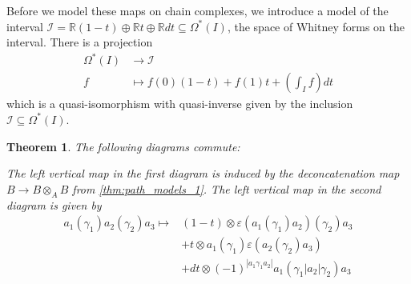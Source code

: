 \documentclass{scrartcl}
\theoremstyle{plain}
\newtheorem{theorem}{Theorem}[section]
\theoremstyle{definition}
\newtheorem{remark}[theorem]{Remark}
\newcommand{\R}{\mathbb R}
\newcommand{\Z}{\mathbb Z}
\newcommand{\abs}[1]{\left\lvert#1\right\rvert}
\renewcommand{\subset}{\subseteq}
\DeclareMathOperator{\Map}{Map}
\begin{document}

Before we model these maps on chain complexes, we introduce a model of the interval $\mathcal I = \R (1-t) \oplus \R t \oplus \R dt\subset \Omega^*(I)$, the space of Whitney forms on the interval. There is a projection 
\begin{align*}
    \Omega^*(I) &\to \mathcal I\\
    f&\mapsto f(0)(1-t) + f(1) t + \left(\int_I f\right) dt
\end{align*}
which is a quasi-isomorphism with quasi-inverse given by the inclusion $\mathcal I \subset \Omega^*(I)$. 


\begin{theorem}
    The following diagrams commute:

    \begin{center}
    \end{center}

    \qquad

    The left vertical map in the first diagram is induced by the deconcatenation map $B\to B\otimes_A B$ from \ref{thm:path_models_1}. The left vertical map in the second diagram is given by 
    \begin{align*}
        a_1(\gamma_1)a_2(\gamma_2)a_3 \mapsto &(1-t)\otimes \varepsilon(a_1(\gamma_1)a_2)(\gamma_2)a_3 \\&+ t\otimes a_1(\gamma_1)\varepsilon(a_2(\gamma_2)a_3) \\&+ dt\otimes (-1)^{\abs{a_1\gamma_1a_2}}a_1(\gamma_1|a_2|\gamma_2)a_3
    \end{align*}
\end{theorem}
\end{document}
